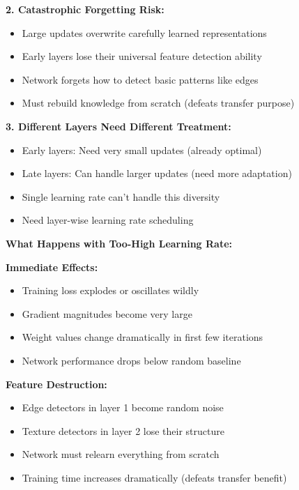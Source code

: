 \documentclass[12pt]{article}
\newcommand{\explanation}[1]{{\color{explanationcolor}#1}}
\begin{document}
\begin{enumerate}[(a)]
{{    \textbf{2. Catastrophic Forgetting Risk:}
    \begin{itemize}
        \item Large updates overwrite carefully learned representations
        \item Early layers lose their universal feature detection ability
        \item Network forgets how to detect basic patterns like edges
        \item Must rebuild knowledge from scratch (defeats transfer purpose)
    \end{itemize}
    
    \textbf{3. Different Layers Need Different Treatment:}
    \begin{itemize}
        \item Early layers: Need very small updates (already optimal)
        \item Late layers: Can handle larger updates (need more adaptation)
        \item Single learning rate can't handle this diversity
        \item Need layer-wise learning rate scheduling
    \end{itemize}
    }
    
    \textbf{What Happens with Too-High Learning Rate:}
    
    \explanation{
    \textbf{Immediate Effects:}
    \begin{itemize}
        \item Training loss explodes or oscillates wildly
        \item Gradient magnitudes become very large
        \item Weight values change dramatically in first few iterations
        \item Network performance drops below random baseline
    \end{itemize}
    
    \textbf{Feature Destruction:}
    \begin{itemize}
        \item Edge detectors in layer 1 become random noise
        \item Texture detectors in layer 2 lose their structure
        \item Network must relearn everything from scratch
        \item Training time increases dramatically (defeats transfer benefit)
    \end{itemize}
    
}}
\end{enumerate}
\end{document}
